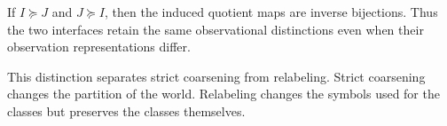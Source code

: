 \begin{theorem}
If \(I\succeq J\) and \(J\succeq I\), then the induced quotient maps are inverse bijections. Thus the two interfaces retain the same observational distinctions even when their observation representations differ.
\end{theorem}
This distinction separates strict coarsening from relabeling. Strict coarsening changes the partition of the world. Relabeling changes the symbols used for the classes but preserves the classes themselves.
